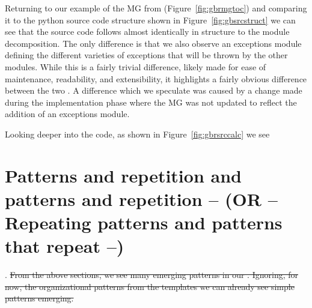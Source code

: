 Returning to our example of the MG from \gb{} (Figure~\ref{fig:gbrmgtoc}) and 
comparing it to the python source code structure shown in 
Figure~\ref{fig:gbsrcstruct} we can see that the source code follows almost 
identically in structure to the module decomposition. The only difference is 
that we also observe an exceptions module defining the different varieties of 
exceptions that will be thrown by the other modules. While this is a fairly 
trivial difference, likely made for ease of maintenance, readability, and 
extensibility, it highlights a fairly obvious difference between the two 
\sfs{}. A difference which we speculate was caused by a change made during the 
implementation phase where the MG was not updated to reflect the addition of an 
exceptions module.


Looking deeper into the code, as shown in Figure~\ref{fig:gbrsrccalc} we see

\section{Patterns and repetition and patterns and repetition -- (OR -- 
Repeating patterns and patterns that repeat --)}
\label{sec:patterns}

. \sout{From the above sections, we see many emerging 
patterns 
in our \sfs{}. Ignoring, 
for now, the organizational patterns from the \smithea{} templates we can 
already see simple patterns emerging.}

